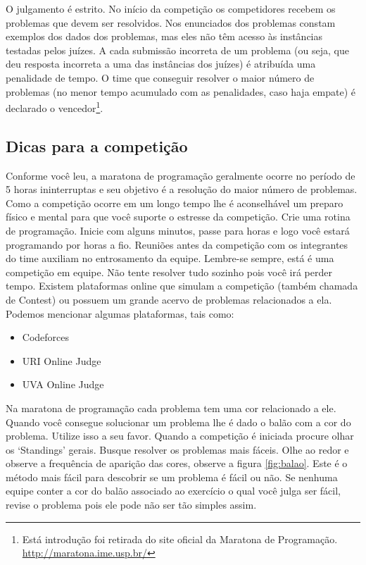 O julgamento é estrito. No início da competição os competidores recebem os problemas que devem ser resolvidos. Nos enunciados dos problemas constam exemplos dos dados dos problemas, mas eles não têm acesso às instâncias testadas pelos juízes. A cada submissão incorreta de um problema (ou seja, que deu resposta incorreta a uma das instâncias dos juízes) é atribuída uma penalidade de tempo. O time que conseguir resolver o maior número de problemas (no menor tempo acumulado com as penalidades, caso haja empate) é declarado o vencedor\footnote{Está introdução foi retirada do site oficial da Maratona de Programação. \url{http://maratona.ime.usp.br/}}. 

\subsection{Dicas para a competição}

Conforme você leu, a maratona de programação geralmente ocorre no período de 5 horas ininterruptas e seu objetivo é a resolução do maior número de problemas. Como a competição ocorre em um longo tempo lhe é aconselhável um preparo físico e mental para que você suporte o estresse da competição. Crie uma rotina de programação. Inicie com alguns minutos, passe para horas e logo você estará programando por horas a fio. Reuniões antes da competição com os integrantes do time auxiliam no entrosamento da equipe. Lembre-se sempre, está é uma competição em equipe. Não tente resolver tudo sozinho pois você irá perder tempo. Existem plataformas online que simulam a competição (também chamada de Contest) ou possuem um grande acervo de problemas relacionados a ela. Podemos mencionar algumas plataformas, tais como:

\begin{itemize}
    \item Codeforces
    \item URI Online Judge
    \item UVA Online Judge
\end{itemize}

Na maratona de programação cada problema tem uma cor relacionado a ele. Quando você consegue solucionar um problema lhe é dado o balão com a cor do problema. Utilize isso a seu favor. Quando a competição é iniciada procure olhar os `Standings' gerais. Busque resolver os problemas mais fáceis. Olhe ao redor e observe a frequência de aparição das cores, observe a figura \ref{fig:balao}. Este é o método mais fácil para descobrir se um problema é fácil ou não. Se nenhuma equipe conter a cor do balão associado ao exercício o qual você julga ser fácil, revise o problema pois ele pode não ser tão simples assim.

